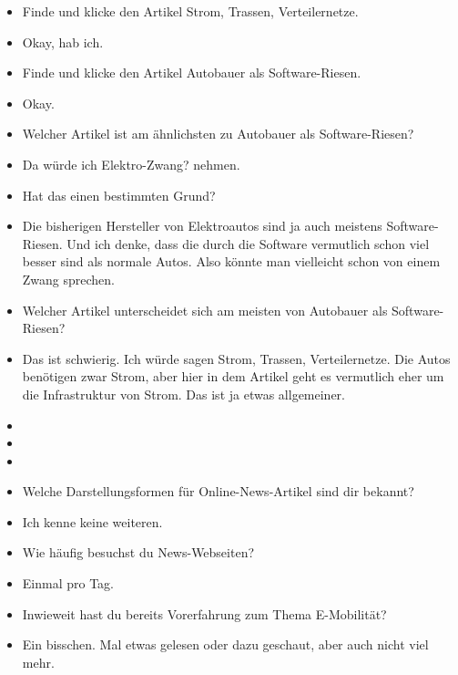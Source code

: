 {\begin{itemize}[]
        \item {} Finde und klicke den Artikel \flqq Strom, Trassen, Verteilernetze\frqq{}.
        \item {} Okay, hab ich.
        \item {} Finde und klicke den Artikel \flqq Autobauer als Software-Riesen\frqq{}.
        \item {} Okay.
        \item {} Welcher Artikel ist am ähnlichsten zu \flqq Autobauer als Software-Riesen\frqq{}?
        \item {} Da würde ich \flqq Elektro-Zwang?\frqq{} nehmen.
        \item {} Hat das einen bestimmten Grund?
        \item {} Die bisherigen Hersteller von Elektroautos sind ja auch meistens Software-Riesen.
              Und ich denke, dass die durch die Software vermutlich schon viel besser sind als normale Autos.
              Also könnte man vielleicht schon von einem Zwang sprechen.
        \item {} Welcher Artikel unterscheidet sich am meisten von \flqq Autobauer als Software-Riesen\frqq{}?
        \item {} Das ist schwierig.
              Ich würde sagen \flqq Strom, Trassen, Verteilernetze\frqq{}.
              Die Autos benötigen zwar Strom, aber hier in dem Artikel geht es vermutlich eher um die Infrastruktur von Strom.
              Das ist ja etwas allgemeiner.
        \item {}
        \item {}
        \item {}
        \item {} Welche Darstellungsformen für Online-News-Artikel sind dir bekannt?
        \item {} Ich kenne keine weiteren.
        \item {} Wie häufig besuchst du News-Webseiten?
        \item {} Einmal pro Tag.
        \item {} Inwieweit hast du bereits Vorerfahrung zum Thema E-Mobilität?
        \item {} Ein bisschen.
              Mal etwas gelesen oder dazu geschaut, aber auch nicht viel mehr.

\end{itemize}}
